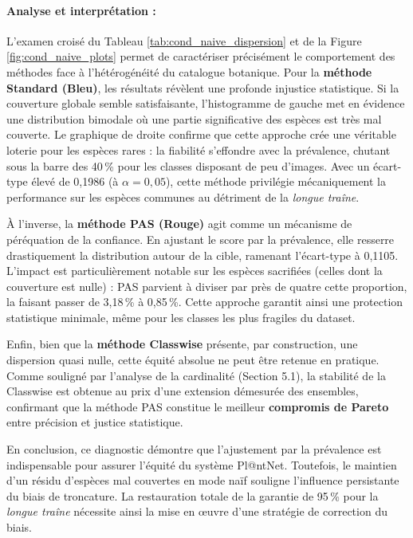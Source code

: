 \documentclass[12pt,a4paper]{article}
\begin{document}
\paragraph{Analyse et interprétation :}

L'examen croisé du Tableau \ref{tab:cond_naive_dispersion} et de la Figure \ref{fig:cond_naive_plots} permet de caractériser précisément le comportement des méthodes face à l'hétérogénéité du catalogue botanique. Pour la \textbf{méthode Standard (Bleu)}, les résultats révèlent une profonde injustice statistique. Si la couverture globale semble satisfaisante, l'histogramme de gauche met en évidence une distribution bimodale où une partie significative des espèces est très mal couverte. Le graphique de droite confirme que cette approche crée une véritable \og loterie \fg{} pour les espèces rares : la fiabilité s'effondre avec la prévalence, chutant sous la barre des 40\,\% pour les classes disposant de peu d'images. Avec un écart-type élevé de 0,1986 (à $\alpha=0,05$), cette méthode privilégie mécaniquement la performance sur les espèces communes au détriment de la \textit{longue traîne}.

À l'inverse, la \textbf{méthode PAS (Rouge)} agit comme un mécanisme de péréquation de la confiance. En ajustant le score par la prévalence, elle resserre drastiquement la distribution autour de la cible, ramenant l'écart-type à 0,1105. L'impact est particulièrement notable sur les \og espèces sacrifiées \fg{} (celles dont la couverture est nulle) : PAS parvient à diviser par près de quatre cette proportion, la faisant passer de 3,18\,\% à 0,85\,\%. Cette approche garantit ainsi une protection statistique minimale, même pour les classes les plus fragiles du dataset.

Enfin, bien que la \textbf{méthode Classwise} présente, par construction, une dispersion quasi nulle, cette équité absolue ne peut être retenue en pratique. Comme souligné par l'analyse de la cardinalité (Section 5.1), la stabilité de la Classwise est obtenue au prix d'une extension démesurée des ensembles, confirmant que la méthode PAS constitue le meilleur \textbf{compromis de Pareto} entre précision et justice statistique. 

En conclusion, ce diagnostic démontre que l'ajustement par la prévalence est indispensable pour assurer l'équité du système Pl@ntNet. Toutefois, le maintien d'un résidu d'espèces mal couvertes en mode naïf souligne l'influence persistante du biais de troncature. La restauration totale de la garantie de 95\,\% pour la \textit{longue traîne} nécessite ainsi la mise en œuvre d'une stratégie de correction du biais.
\end{document}
